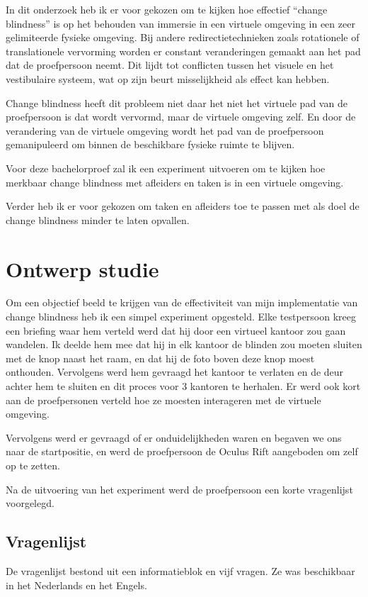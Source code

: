 In dit onderzoek heb ik er voor gekozen om te kijken hoe effectief ``change
blindness'' is op het behouden van immersie in een virtuele omgeving in een
zeer gelimiteerde fysieke omgeving. Bij andere redirectietechnieken zoals
rotationele of translationele vervorming worden er constant veranderingen
gemaakt aan het pad dat de proefpersoon neemt. Dit lijdt tot conflicten tussen
het visuele en het vestibulaire systeem, wat op zijn beurt misselijkheid als
effect kan hebben.

Change blindness heeft dit probleem niet daar het niet het virtuele pad van de
proefpersoon is dat wordt vervormd, maar de virtuele omgeving zelf. En door de
verandering van de virtuele omgeving wordt het pad van de proefpersoon 
gemanipuleerd om binnen de beschikbare fysieke ruimte te blijven.

Voor deze bachelorproef zal ik een experiment uitvoeren om te kijken hoe 
merkbaar change blindness met afleiders en taken is in een virtuele omgeving.

Verder heb ik er voor gekozen om taken en afleiders toe te passen met als doel
de change blindness minder te laten opvallen.

\section{Ontwerp studie}
Om een objectief beeld te krijgen van de effectiviteit van mijn implementatie van
change blindness heb ik een simpel experiment opgesteld. Elke testpersoon kreeg
een briefing waar hem verteld werd dat hij door een virtueel kantoor zou gaan
wandelen. Ik deelde hem mee dat hij in elk kantoor de blinden zou moeten sluiten 
met de knop naast het raam, en dat hij de foto boven deze knop moest onthouden.
Vervolgens werd hem gevraagd het kantoor te verlaten en de deur achter hem te
sluiten en dit proces voor 3 kantoren te herhalen. Er werd ook kort aan de 
proefpersonen verteld hoe ze moesten interageren met de virtuele omgeving.

Vervolgens werd er gevraagd of er onduidelijkheden waren en begaven we ons naar 
de startpositie, en werd de proefpersoon de Oculus Rift aangeboden om zelf op te 
zetten.

Na de uitvoering van het experiment werd de proefpersoon een korte vragenlijst
voorgelegd.


\subsection{Vragenlijst}
De vragenlijst bestond uit een informatieblok en vijf vragen. Ze was beschikbaar
in het Nederlands en het Engels.

